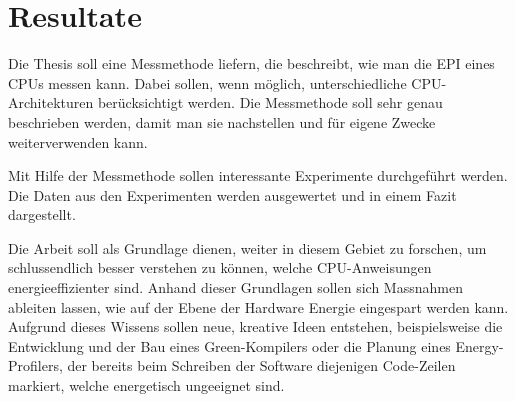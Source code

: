 \chapter{Resultate}

Die Thesis soll eine Messmethode liefern, die beschreibt, wie man die EPI eines CPUs messen kann. Dabei sollen, wenn möglich,
unterschiedliche CPU-Architekturen berücksichtigt werden. Die Messmethode soll sehr genau beschrieben werden, damit man sie
nachstellen und für eigene Zwecke weiterverwenden kann.
\par
Mit Hilfe der Messmethode sollen interessante Experimente durchgeführt werden. Die Daten aus den Experimenten werden ausgewertet
und in einem Fazit dargestellt.
\par
Die Arbeit soll als Grundlage dienen, weiter in diesem Gebiet zu forschen, um schlussendlich besser verstehen zu können,
welche CPU-Anweisungen energieeffizienter sind.
Anhand dieser Grundlagen sollen sich Massnahmen ableiten lassen, wie auf der Ebene der Hardware Energie eingespart werden kann.
Aufgrund dieses Wissens sollen neue, kreative Ideen entstehen, beispielsweise die Entwicklung und der Bau eines Green-Kompilers
oder die Planung eines Energy-Profilers, der bereits beim Schreiben der Software diejenigen Code-Zeilen markiert, welche energetisch
ungeeignet sind.



